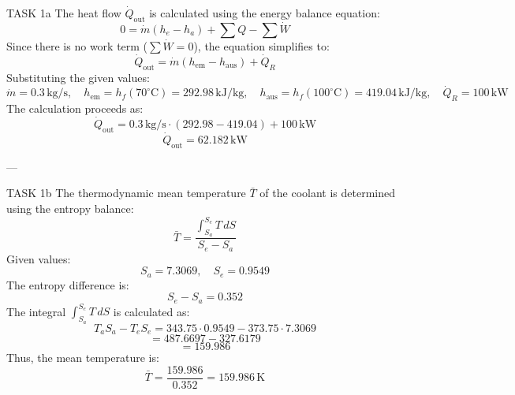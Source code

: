 TASK 1a  
The heat flow \( \dot{Q}_{\text{out}} \) is calculated using the energy balance equation:  
\[
0 = \dot{m} (h_e - h_a) + \sum Q - \sum \dot{W}
\]  
Since there is no work term (\( \sum \dot{W} = 0 \)), the equation simplifies to:  
\[
\dot{Q}_{\text{out}} = \dot{m} (h_{\text{em}} - h_{\text{aus}}) + \dot{Q}_R
\]  
Substituting the given values:  
\[
\dot{m} = 0.3 \, \text{kg/s}, \quad h_{\text{em}} = h_f(70^\circ\text{C}) = 292.98 \, \text{kJ/kg}, \quad h_{\text{aus}} = h_f(100^\circ\text{C}) = 419.04 \, \text{kJ/kg}, \quad \dot{Q}_R = 100 \, \text{kW}
\]  
The calculation proceeds as:  
\[
\dot{Q}_{\text{out}} = 0.3 \, \text{kg/s} \cdot (292.98 - 419.04) + 100 \, \text{kW}
\]  
\[
\dot{Q}_{\text{out}} = 62.182 \, \text{kW}
\]  

---

TASK 1b  
The thermodynamic mean temperature \( \bar{T} \) of the coolant is determined using the entropy balance:  
\[
\bar{T} = \frac{\int_{S_a}^{S_e} T \, dS}{S_e - S_a}
\]  
Given values:  
\[
S_a = 7.3069, \quad S_e = 0.9549
\]  
The entropy difference is:  
\[
S_e - S_a = 0.352
\]  
The integral \( \int_{S_a}^{S_e} T \, dS \) is calculated as:  
\[
T_a S_a - T_e S_e = 343.75 \cdot 0.9549 - 373.75 \cdot 7.3069
\]  
\[
= 487.6697 - 327.6179
\]  
\[
= 159.986
\]  
Thus, the mean temperature is:  
\[
\bar{T} = \frac{159.986}{0.352} = 159.986 \, \text{K}
\]  